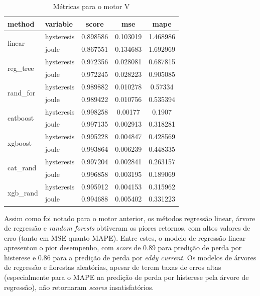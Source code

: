 \documentclass{article}
\begin{document}
\begin{table}[!htbp]
\centering
\caption{Métricas para o motor V}
\begin{tabular}{llccc}
\toprule
\textbf{method} & \textbf{variable} & \textbf{score} & \textbf{mse} & \textbf{mape} \\
\midrule
\multirow{2}{*}{linear} 
    & hysteresis & 0.898586 & 0.103019 & 1.468986 \\
    & joule      & 0.867551 & 0.134683 & 1.692969 \\
\midrule
\multirow{2}{*}{reg\_tree} 
    & hysteresis & 0.972356 & 0.028081 & 0.687815 \\
    & joule      & 0.972245 & 0.028223 & 0.905085 \\
\midrule
\multirow{2}{*}{rand\_for} 
    & hysteresis & 0.989882 & 0.010278 & 0.57334 \\
    & joule      & 0.989422 & 0.010756 & 0.535394 \\
\midrule
\multirow{2}{*}{catboost} 
    & hysteresis & 0.998258 & 0.00177 & 0.1907 \\
    & joule      & 0.997135 & 0.002913 & 0.318281 \\
\midrule
\multirow{2}{*}{xgboost} 
    & hysteresis & 0.995228 & 0.004847 & 0.428569 \\
    & joule      & 0.993864 & 0.006239 & 0.448335 \\
\midrule
\multirow{2}{*}{cat\_rand} 
    & hysteresis &0.997204 &	0.002841 &	0.263157 \\
    & joule      & 0.996858 &	0.003195 &	0.189069 \\
\midrule
\multirow{2}{*}{xgb\_rand} 
    & hysteresis & 0.995912 &	0.004153 &	0.315962 \\
    & joule      & 0.994688 &	0.005402 &	0.331223 \\
\bottomrule
\end{tabular}
\end{table}

Assim como foi notado para o motor anterior, os métodos regressão linear, árvore de regressão e \textit{random forests} obtiveram os piores retornos, com altos valores de erro (tanto em MSE quanto MAPE). Entre estes, o modelo de regressão linear apresentou o pior desempenho, com \textit{score} de 0.89 para predição de perda por histerese e 0.86 para a predição de perda por \textit{eddy current}. Os modelos de árvores de regressão e florestas aleatórias, apesar de terem taxas de erros altas (especialmente para o MAPE na predição de perda por histerese pela árvore de regressão), não retornaram \textit{scores} insatisfatórios. 
\end{document}
